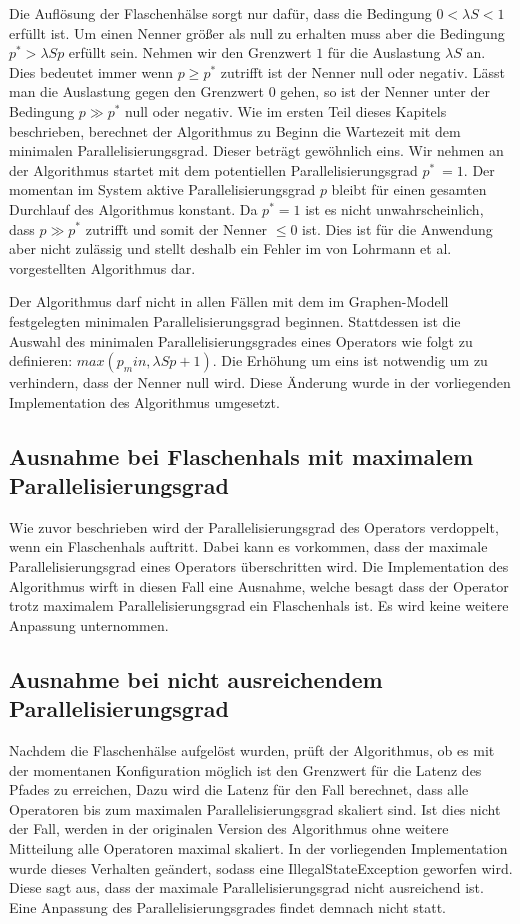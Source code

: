 Die Auflösung der Flaschenhälse sorgt nur dafür, dass die Bedingung \( 0 < \lambda S < 1 \) erfüllt ist.
Um einen Nenner größer als null zu erhalten muss aber die Bedingung \(p^\ast > \lambda S p\) erfüllt sein.
Nehmen wir den Grenzwert \(1\) für die Auslastung \(\lambda S\) an.
Dies bedeutet immer wenn \(p \geq p^\ast\) zutrifft ist der Nenner null oder negativ.
Lässt man die Auslastung gegen den Grenzwert \(0\) gehen, so ist der Nenner unter der Bedingung \(p \gg p^\ast\) null oder negativ.
Wie im ersten Teil dieses Kapitels beschrieben, berechnet der Algorithmus zu Beginn die Wartezeit mit dem minimalen Parallelisierungsgrad.
Dieser beträgt gewöhnlich eins.
Wir nehmen an der Algorithmus startet mit dem potentiellen Parallelisierungsgrad \(p^\ast\ = 1\).
Der momentan im System aktive Parallelisierungsgrad \(p\) bleibt für einen gesamten Durchlauf des Algorithmus konstant.
Da \(p^\ast = 1\) ist es nicht unwahrscheinlich, dass \(p \gg p^\ast\) zutrifft und somit der Nenner \(\leq 0\) ist.
Dies ist für die Anwendung aber nicht zulässig und stellt deshalb ein Fehler im von Lohrmann et al. vorgestellten Algorithmus dar.

Der Algorithmus darf nicht in allen Fällen mit dem im Graphen-Modell festgelegten minimalen Parallelisierungsgrad beginnen.
Stattdessen ist die Auswahl des minimalen Parallelisierungsgrades eines Operators wie folgt zu definieren: \(max(p_min, \lambda S p + 1)\).
Die Erhöhung um eins ist notwendig um zu verhindern, dass der Nenner null wird.
Diese Änderung wurde in der vorliegenden Implementation des Algorithmus umgesetzt.

\subsection{Ausnahme bei Flaschenhals mit maximalem Parallelisierungsgrad}
Wie zuvor beschrieben wird der Parallelisierungsgrad des Operators verdoppelt, wenn ein Flaschenhals auftritt. 
Dabei kann es vorkommen, dass der maximale Parallelisierungsgrad eines Operators überschritten wird. 
Die Implementation des Algorithmus wirft in diesen Fall eine Ausnahme, welche besagt dass der Operator trotz maximalem Parallelisierungsgrad ein Flaschenhals ist.
Es wird keine weitere Anpassung unternommen.

\subsection{Ausnahme bei nicht ausreichendem Parallelisierungsgrad}
Nachdem die Flaschenhälse aufgelöst wurden, prüft der Algorithmus, ob es mit der momentanen Konfiguration möglich ist den Grenzwert für die Latenz des Pfades zu erreichen,
Dazu wird die Latenz für den Fall berechnet, dass alle Operatoren bis zum maximalen Parallelisierungsgrad skaliert sind. Ist dies nicht der Fall, werden in der originalen Version des Algorithmus ohne weitere Mitteilung alle Operatoren maximal skaliert. In der vorliegenden Implementation wurde dieses Verhalten geändert, sodass eine IllegalStateException geworfen wird. Diese sagt aus, dass der maximale Parallelisierungsgrad nicht ausreichend ist. Eine Anpassung des Parallelisierungsgrades findet demnach nicht statt.


